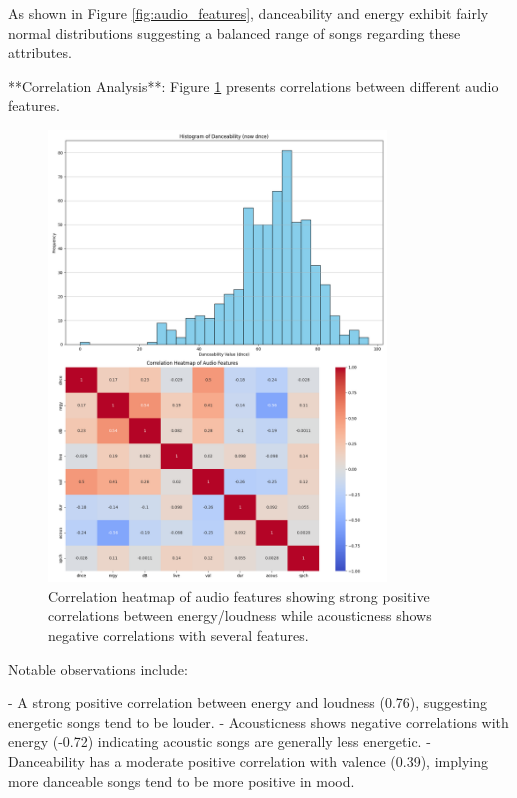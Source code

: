 \documentclass[runningheads]{llncs}
\begin{document}
As shown in Figure \ref{fig:audio_features}, danceability and energy exhibit fairly normal distributions suggesting a balanced range of songs regarding these attributes.

**Correlation Analysis**: Figure \ref{fig:correlation} presents correlations between different audio features.

\begin{figure}[h]
    \centering
    \includegraphics[width=0.8\textwidth]{correlation_heatmap.png} %
    \caption{Correlation heatmap of audio features showing strong positive correlations between energy/loudness while acousticness shows negative correlations with several features.}
    \label{fig:correlation}
\end{figure}

Notable observations include:

- A strong positive correlation between energy and loudness (0.76), suggesting energetic songs tend to be louder.
- Acousticness shows negative correlations with energy (-0.72) indicating acoustic songs are generally less energetic.
- Danceability has a moderate positive correlation with valence (0.39), implying more danceable songs tend to be more positive in mood.
\end{document}
